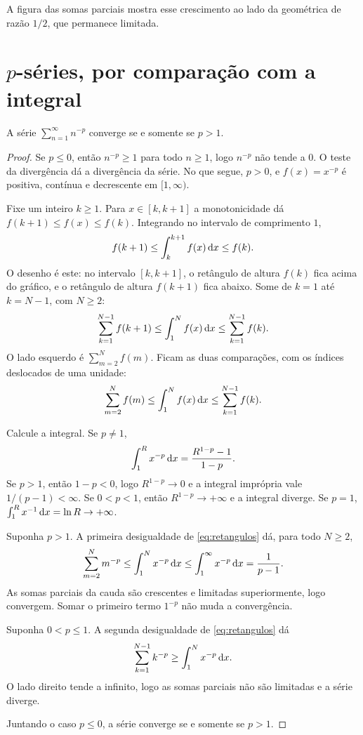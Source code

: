 \documentclass[11pt,a4paper]{article}
\begin{document}
A figura das somas parciais mostra esse crescimento ao lado da geométrica de razão \(1/2\), que permanece limitada.

\section{\(p\)-séries, por comparação com a integral}

\begin{teorema}
A série \(\sum_{n=1}^\infty n^{-p}\) converge se e somente se \(p>1\).
\end{teorema}


\begin{proof}
Se \(p\le 0\), então \(n^{-p}\ge 1\) para todo \(n\ge 1\), logo \(n^{-p}\) não tende a \(0\). O teste da divergência dá a divergência da série. No que segue, \(p>0\), e \(f(x)=x^{-p}\) é positiva, contínua e decrescente em \([1,\infty)\).

Fixe um inteiro \(k\ge 1\). Para \(x\in[k,k+1]\) a monotonicidade dá \(f(k+1)\le f(x)\le f(k)\). Integrando no intervalo de comprimento \(1\),
\[
f(k+1)\le\int_k^{k+1} f(x)\,\mathrm{d} x\le f(k).
\]
O desenho é este: no intervalo \([k,k+1]\), o retângulo de altura \(f(k)\) fica acima do gráfico, e o retângulo de altura \(f(k+1)\) fica abaixo. Some de \(k=1\) até \(k=N-1\), com \(N\ge 2\):
\[
\sum_{k=1}^{N-1} f(k+1)
\le\int_1^N f(x)\,\mathrm{d} x
\le\sum_{k=1}^{N-1} f(k).
\]
O lado esquerdo é \(\sum_{m=2}^{N} f(m)\). Ficam as duas comparações, com os índices deslocados de uma unidade:
\begin{equation}
\label{eq:retangulos}
\sum_{m=2}^{N} f(m)
\le\int_1^N f(x)\,\mathrm{d} x
\le\sum_{k=1}^{N-1} f(k).
\end{equation}

Calcule a integral. Se \(p\neq 1\),
\[
\int_1^R x^{-p}\,\mathrm{d} x=\frac{R^{1-p}-1}{1-p}.
\]
Se \(p>1\), então \(1-p<0\), logo \(R^{1-p}\to 0\) e a integral imprópria vale \(1/(p-1)<\infty\). Se \(0<p<1\), então \(R^{1-p}\to+\infty\) e a integral diverge. Se \(p=1\), \(\int_1^R x^{-1}\,\mathrm{d} x=\ln R\to+\infty\).

Suponha \(p>1\). A primeira desigualdade de \eqref{eq:retangulos} dá, para todo \(N\ge 2\),
\[
\sum_{m=2}^{N} m^{-p}\le\int_1^N x^{-p}\,\mathrm{d} x\le\int_1^\infty x^{-p}\,\mathrm{d} x=\frac{1}{p-1}.
\]
As somas parciais da cauda são crescentes e limitadas superiormente, logo convergem. Somar o primeiro termo \(1^{-p}\) não muda a convergência.

Suponha \(0<p\le 1\). A segunda desigualdade de \eqref{eq:retangulos} dá
\[
\sum_{k=1}^{N-1} k^{-p}\ge\int_1^N x^{-p}\,\mathrm{d} x.
\]
O lado direito tende a infinito, logo as somas parciais não são limitadas e a série diverge.

Juntando o caso \(p\le 0\), a série converge se e somente se \(p>1\).
\end{proof}
\end{document}

